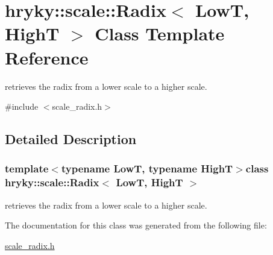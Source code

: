 \hypertarget{classhryky_1_1scale_1_1_radix}{\section{hryky\-:\-:scale\-:\-:Radix$<$ Low\-T, High\-T $>$ Class Template Reference}
\label{classhryky_1_1scale_1_1_radix}
}


retrieves the radix from a lower scale to a higher scale.  




{\ttfamily \#include $<$scale\-\_\-radix.\-h$>$}



\subsection{Detailed Description}
\subsubsection*{template$<$typename Low\-T, typename High\-T$>$class hryky\-::scale\-::\-Radix$<$ Low\-T, High\-T $>$}

retrieves the radix from a lower scale to a higher scale. 

The documentation for this class was generated from the following file\-:\begin{DoxyCompactItemize}
\item 
\hyperlink{scale__radix_8h}{scale\-\_\-radix.\-h}\end{DoxyCompactItemize}
